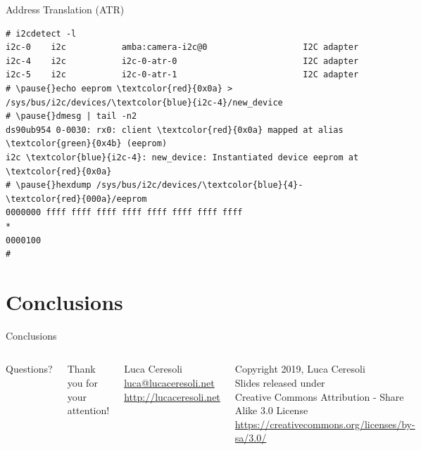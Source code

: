 \documentclass[xetex,table,aspectratio=169]{beamer}
\begin{document}
\begin{frame}[fragile]{Address Translation (ATR)}
  \begin{Verbatim}[commandchars=\\\{\}]
# i2cdetect -l
i2c-0    i2c           amba:camera-i2c@0                   I2C adapter
i2c-4    i2c           i2c-0-atr-0                         I2C adapter
i2c-5    i2c           i2c-0-atr-1                         I2C adapter
# \pause{}echo eeprom \textcolor{red}{0x0a} > /sys/bus/i2c/devices/\textcolor{blue}{i2c-4}/new_device
# \pause{}dmesg | tail -n2
ds90ub954 0-0030: rx0: client \textcolor{red}{0x0a} mapped at alias \textcolor{green}{0x4b} (eeprom)
i2c \textcolor{blue}{i2c-4}: new_device: Instantiated device eeprom at \textcolor{red}{0x0a}
# \pause{}hexdump /sys/bus/i2c/devices/\textcolor{blue}{4}-\textcolor{red}{000a}/eeprom
0000000 ffff ffff ffff ffff ffff ffff ffff ffff
*
0000100
#
  \end{Verbatim}
\end{frame}


\section{Conclusions}


\begin{frame}{Conclusions}
\end{frame}

\begin{frame}
  \begin{columns}
    \center

    {\Huge Questions?}

    \center

    {\Large Thank you for your attention!}

    \vspace{0.15\textheight}

    {\Large Luca Ceresoli}\\
    \href{mailto:luca@lucaceresoli.net}{luca@lucaceresoli.net}\\
    \url{http://lucaceresoli.net}

    \vspace{0.05\textheight}

    \tiny
    \textcopyright{} Copyright 2019, Luca Ceresoli\\
    Slides released under\\
    Creative Commons Attribution - Share Alike 3.0 License \\
    \url{https://creativecommons.org/licenses/by-sa/3.0/} \\
\end{columns}
\end{frame}
\end{document}
